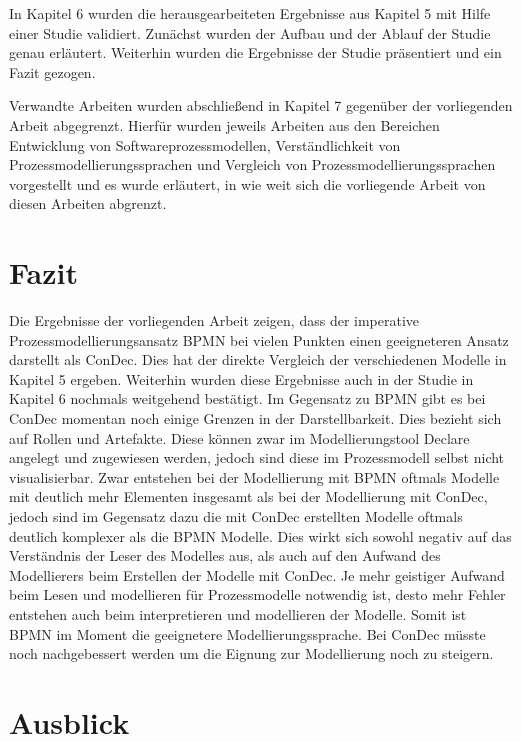 In Kapitel 6 wurden die herausgearbeiteten Ergebnisse aus Kapitel 5 mit Hilfe einer Studie validiert. Zunächst wurden der Aufbau und der Ablauf der Studie genau erläutert. Weiterhin wurden die Ergebnisse der Studie präsentiert und ein Fazit gezogen. \newline

Verwandte Arbeiten wurden abschließend in Kapitel 7 gegenüber der vorliegenden Arbeit abgegrenzt. Hierfür wurden jeweils Arbeiten aus den Bereichen Entwicklung von Softwareprozessmodellen, Verständlichkeit von Prozessmodellierungssprachen und Vergleich von Prozessmodellierungssprachen vorgestellt und es wurde erläutert, in wie weit sich die vorliegende Arbeit von diesen Arbeiten abgrenzt.

\section{Fazit}

Die Ergebnisse der vorliegenden Arbeit zeigen, dass der imperative Prozessmodellierungsansatz BPMN bei vielen Punkten einen geeigneteren Ansatz darstellt als ConDec. Dies hat der direkte Vergleich der verschiedenen Modelle in Kapitel 5 ergeben. Weiterhin wurden diese Ergebnisse auch in der Studie in Kapitel 6 nochmals weitgehend bestätigt.\newline
Im Gegensatz zu BPMN gibt es bei ConDec momentan noch einige Grenzen in der Darstellbarkeit. Dies bezieht sich auf Rollen und Artefakte. Diese können zwar im Modellierungstool Declare angelegt und zugewiesen werden, jedoch sind diese im Prozessmodell selbst nicht visualisierbar.\newline
Zwar entstehen bei der Modellierung mit BPMN oftmals Modelle mit deutlich mehr Elementen insgesamt als bei der Modellierung mit ConDec, jedoch sind im Gegensatz dazu die mit ConDec erstellten Modelle oftmals deutlich komplexer als die BPMN Modelle. Dies wirkt sich sowohl negativ auf das Verständnis der Leser des Modelles aus, als auch auf den Aufwand des Modellierers beim Erstellen der Modelle mit ConDec. Je mehr geistiger Aufwand beim Lesen und modellieren für Prozessmodelle notwendig ist, desto mehr Fehler entstehen auch beim interpretieren und modellieren der Modelle.\newline
Somit ist BPMN im Moment die geeignetere Modellierungssprache. Bei ConDec müsste noch nachgebessert werden um die Eignung zur Modellierung noch zu steigern.\newline


\section{Ausblick}

